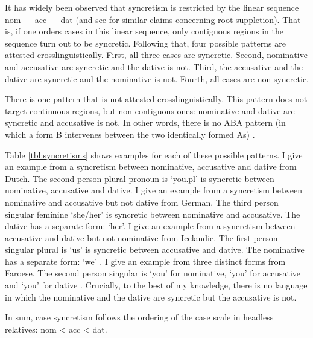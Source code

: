 It has widely been observed that syncretism is restricted by the linear sequence \ac{nom} --- \ac{acc} --- \ac{dat} \citep{baerman2005,caha2009,zompi2017} (and see \citealt{mcfadden2018,smith2019} for similar claims concerning root suppletion). That is, if one orders cases in this linear sequence, only contiguous regions in the sequence turn out to be syncretic.
Following that, four possible patterns are attested crosslinguistically. First, all three cases are syncretic. Second, nominative and accusative are syncretic and the dative is not. Third, the accusative and the dative are syncretic and the nominative is not. Fourth, all cases are non-syncretic.

There is one pattern that is not attested crosslinguistically. This pattern does not target continuous regions, but non-contiguous ones: nominative and dative are syncretic and accusative is not. In other words, there is no ABA pattern (in which a form B intervenes between the two identically formed As) \citep{bobaljik2012}.

Table \ref{tbl:syncretisms} shows examples for each of these possible patterns. I give an example from a syncretism between nominative, accusative and dative from Dutch. The second person plural pronoun is  `you.\ac{pl}' is syncretic between nominative, accusative and dative.
I give an example from a syncretism between nominative and accusative but not dative from German. The third person singular feminine  `she/her' is syncretic between nominative and accusative. The dative has a separate form:  `her'.
I give an example from a syncretism between accusative and dative but not nominative from Icelandic. The first person singular plural is  `us' is syncretic between accusative and dative. The nominative has a separate form:  `we' .
I give an example from three distinct forms from Faroese. The second person singular is  `you' for nominative,  `you' for accusative and  `you' for dative .
Crucially, to the best of my knowledge, there is no language in which the nominative and the dative are syncretic but the accusative is not.

\begin{table}[ht]
  \center
  \caption {}
    
  \label{tbl:syncretisms}
\end{table}

In sum, case syncretism follows the ordering of the case scale in headless relatives: \ac{nom} < \ac{acc} < \ac{dat}.


